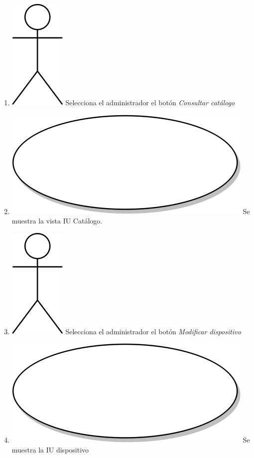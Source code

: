 \begin{enumerate}
  \item {\includegraphics[scale=.1]{Capitulo3/img/actor.png} Selecciona el administrador el botón \textit{Consultar catálogo}}
  \item {\includegraphics[scale=.05]{Capitulo3/img/proceso.png} Se muestra la vista IU Catálogo.}
  \item {\includegraphics[scale=.1]{Capitulo3/img/actor.png} Selecciona el administrador el botón \textit{Modificar dispositivo}}
  \item {\includegraphics[scale=.05]{Capitulo3/img/proceso.png} Se muestra la IU dispositivo }

\end{enumerate}
